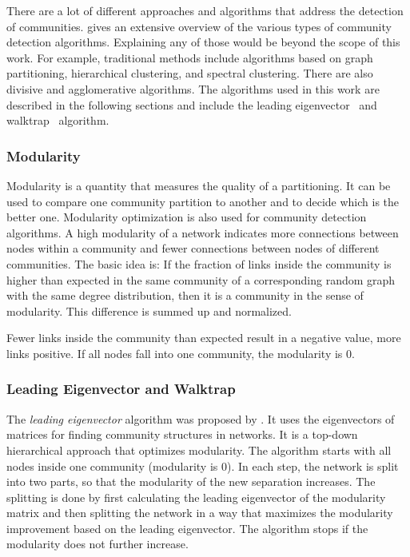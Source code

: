 There are a lot of different approaches and algorithms that address the detection of communities. \textcite{fortunato2010community} gives an extensive overview of the various types of community detection algorithms.
Explaining any of those would be beyond the scope of this work. For example, traditional methods include algorithms based on graph partitioning, hierarchical clustering, and spectral clustering. There are also divisive and agglomerative algorithms.
The algorithms used in this work are described in the following sections and include the leading eigenvector~\cite{newman2006finding} and walktrap~\cite{pons2005computing} algorithm.

\subsubsection{Modularity}
Modularity is a quantity that measures the quality of a partitioning.
It can be used to compare one community partition to another and to decide which is the better one.
Modularity optimization is also used for community detection algorithms.
A high modularity of a network indicates more connections between nodes within a community and fewer connections between nodes of different communities.
The basic idea is: If the fraction of links inside the community is higher than expected in the same community of a corresponding random graph with the same degree distribution, then it is a community in the sense of modularity.
This difference is summed up and normalized.

Fewer links inside the community than expected result in a negative value, more links positive.
If all nodes fall into one community, the modularity is $0$.


\subsubsection{Leading Eigenvector and Walktrap}
The \emph{leading eigenvector} algorithm was proposed by \textcite{newman2006finding}.
It uses the eigenvectors of matrices for finding community structures in networks.
It is a top-down hierarchical approach that optimizes modularity.
The algorithm starts with all nodes inside one community (modularity is 0).
In each step, the network is split into two parts, so that the modularity of the new separation increases.
The splitting is done by first calculating the leading eigenvector of the modularity matrix and then splitting the network in a way that maximizes the modularity improvement based on the leading eigenvector.
The algorithm stops if the modularity does not further increase.

